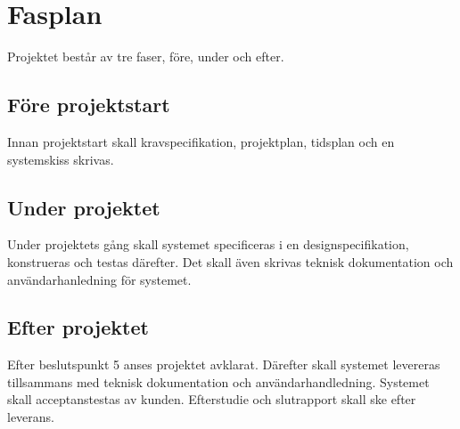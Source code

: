 \section{Fasplan}
Projektet består av tre faser, före, under och efter.

\subsection{Före projektstart}
Innan projektstart skall kravspecifikation, projektplan, tidsplan och en systemskiss skrivas.

\subsection{Under projektet}
Under projektets gång skall systemet specificeras i en designspecifikation, konstrueras och testas därefter. Det skall även skrivas teknisk dokumentation och användarhanledning för systemet.

\subsection{Efter projektet}
Efter beslutspunkt 5 anses projektet avklarat. Därefter skall systemet levereras tillsammans med teknisk dokumentation och användarhandledning. Systemet skall acceptanstestas av kunden. Efterstudie och slutrapport skall ske efter leverans.